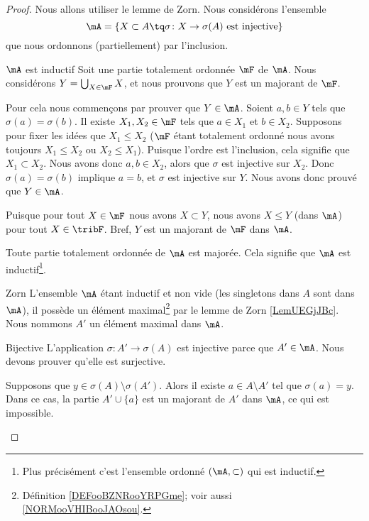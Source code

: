 \begin{proof}
    Nous allons utiliser le lemme de Zorn. Nous considérons l'ensemble
    \begin{equation}
        \mA=\{ X\subset A\tq \sigma\colon X\to \sigma(A) \text{ est injective} \}
    \end{equation}
    que nous ordonnons (partiellement) par l'inclusion.
    \begin{subproof}
    \item[\( \mA\) est inductif]
        Soit une partie totalement ordonnée \( \mF\) de \( \mA\). Nous considérons \( Y=\bigcup_{X\in \mF}X\), et nous prouvons que \( Y\) est un majorant de \( \mF\).

        Pour cela nous commençons par prouver que \( Y\in \mA\). Soient \( a,b\in Y\) tels que \( \sigma(a)=\sigma(b)\). Il existe \( X_1,X_2\in \mF\) tels que \( a\in X_1\) et \( b\in X_2\). Supposons pour fixer les idées que \( X_1\leq X_2\) (\( \mF\) étant totalement ordonné nous avons toujours \( X_1\leq X_2\) ou \( X_2\leq X_1\)). Puisque l'ordre est l'inclusion, cela signifie que \( X_1\subset X_2\). Nous avons donc \( a,b\in X_2\), alors que \( \sigma\) est injective sur \( X_2\). Donc \(\sigma(a)=\sigma(b)\) implique \( a=b\), et \( \sigma\) est injective sur \( Y\). Nous avons donc prouvé que \( Y\in \mA\).

        Puisque pour tout \( X\in\mF\) nous avons \( X\subset Y\), nous avons \( X\leq Y\) (dans \( \mA\)) pour tout \( X\in \tribF\). Bref, \( Y\) est un majorant de \( \mF\) dans \( \mA\).

        Toute partie totalement ordonnée de \( \mA\) est majorée. Cela signifie que \( \mA\) est inductif\footnote{Plus précisément c'est l'ensemble ordonné \( (\mA,\subset)\) qui est inductif.}.
    \item[Zorn]
        L'ensemble \( \mA\) étant inductif et non vide (les singletons dans \( A\) sont dans \( \mA\)), il possède un élément maximal\footnote{Définition \ref{DEFooBZNRooYRPGme}; voir aussi \ref{NORMooVHIBooJAOsou}.} par le lemme de Zorn \ref{LemUEGjJBc}. Nous nommons \( A'\) un élément maximal dans \( \mA\).
    \item[Bijective]
        L'application \( \sigma\colon A'\to \sigma(A)\) est injective parce que \( A'\in \mA\). Nous devons prouver qu'elle est surjective.

        Supposons que \( y\in\sigma(A)\setminus\sigma(A')\). Alors il existe \( a\in A\setminus A'\) tel que \( \sigma(a)=y\). Dans ce cas, la partie \( A'\cup\{ a \}\) est un majorant de \( A'\) dans \( \mA\), ce qui est impossible.


\end{subproof}
\end{proof}

